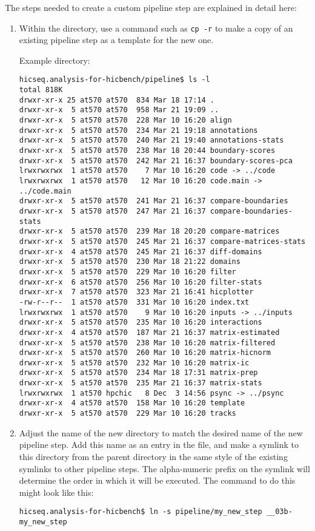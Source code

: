 The steps needed to create a custom pipeline step are explained in detail here:
\begin{enumerate}
\item Within the  directory, use a command such as \texttt{cp -r} to make a copy of an existing pipeline step as a template for the new one. 

Example  directory:
\begin{lstlisting}
hicseq.analysis-for-hicbench/pipeline$ ls -l
total 818K
drwxr-xr-x 25 at570 at570  834 Mar 18 17:14 .
drwxr-xr-x  5 at570 at570  958 Mar 21 19:09 ..
drwxr-xr-x  5 at570 at570  228 Mar 10 16:20 align
drwxr-xr-x  5 at570 at570  234 Mar 21 19:18 annotations
drwxr-xr-x  5 at570 at570  240 Mar 21 19:40 annotations-stats
drwxr-xr-x  5 at570 at570  238 Mar 18 20:44 boundary-scores
drwxr-xr-x  5 at570 at570  242 Mar 21 16:37 boundary-scores-pca
lrwxrwxrwx  1 at570 at570    7 Mar 10 16:20 code -> ../code
lrwxrwxrwx  1 at570 at570   12 Mar 10 16:20 code.main -> ../code.main
drwxr-xr-x  5 at570 at570  241 Mar 21 16:37 compare-boundaries
drwxr-xr-x  5 at570 at570  247 Mar 21 16:37 compare-boundaries-stats
drwxr-xr-x  5 at570 at570  239 Mar 18 20:20 compare-matrices
drwxr-xr-x  5 at570 at570  245 Mar 21 16:37 compare-matrices-stats
drwxr-xr-x  4 at570 at570  245 Mar 21 16:37 diff-domains
drwxr-xr-x  5 at570 at570  230 Mar 18 21:22 domains
drwxr-xr-x  5 at570 at570  229 Mar 10 16:20 filter
drwxr-xr-x  6 at570 at570  256 Mar 10 16:20 filter-stats
drwxr-xr-x  7 at570 at570  323 Mar 21 16:41 hicplotter
-rw-r--r--  1 at570 at570  331 Mar 10 16:20 index.txt
lrwxrwxrwx  1 at570 at570    9 Mar 10 16:20 inputs -> ../inputs
drwxr-xr-x  5 at570 at570  235 Mar 10 16:20 interactions
drwxr-xr-x  4 at570 at570  187 Mar 21 16:37 matrix-estimated
drwxr-xr-x  5 at570 at570  238 Mar 10 16:20 matrix-filtered
drwxr-xr-x  5 at570 at570  260 Mar 10 16:20 matrix-hicnorm
drwxr-xr-x  5 at570 at570  232 Mar 10 16:20 matrix-ic
drwxr-xr-x  5 at570 at570  234 Mar 18 17:31 matrix-prep
drwxr-xr-x  5 at570 at570  235 Mar 21 16:37 matrix-stats
lrwxrwxrwx  1 at570 hpchic   8 Dec  3 14:56 psync -> ../psync
drwxr-xr-x  4 at570 at570  158 Mar 10 16:20 template
drwxr-xr-x  5 at570 at570  229 Mar 10 16:20 tracks
\end{lstlisting}

\item Adjust the name of the new directory to match the desired name of the new pipeline step. Add this name as an entry in the  file, and make a symlink to this directory from the parent directory in the same style of the existing symlinks to other pipeline steps. The alpha-numeric prefix on the symlink will determine the order in which it will be executed. The command to do this might look like this:
\begin{lstlisting}
hicseq.analysis-for-hicbench$ ln -s pipeline/my_new_step __03b-my_new_step
\end{lstlisting}


\end{enumerate}
